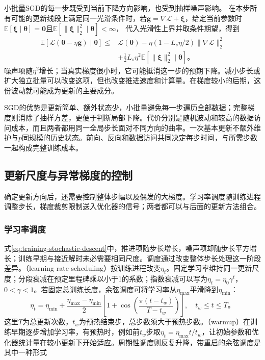 小批量SGD的每一步既受到当前下降方向影响，也受到抽样噪声影响。
在本步所有可能的更新线段上满足同一光滑条件时，若$\bm g=\nabla\mathcal L+\bm\xi$，给定当前参数时
$\mathbb E[\bm\xi\mid\bm\theta]=\bm0$且$\mathbb E[\lVert\bm\xi\rVert_2^2\mid\bm\theta]<\infty$，
代入光滑性上界并取条件期望，得到
\begin{equation}
  \begin{aligned}
  \mathbb E[\mathcal L(\bm\theta-\eta\bm g)\mid\bm\theta]
  \leq{}&\mathcal L(\bm\theta)
    -\eta(1-L_s\eta/2)\lVert\nabla\mathcal L\rVert_2^2\\
    &+\tfrac12L_s\eta^2\mathbb E[\lVert\bm\xi\rVert_2^2\mid\bm\theta]\text{。}
  \end{aligned}
  \label{eq:training-stochastic-descent}
\end{equation}
噪声项随$\eta^2$增长；当真实梯度很小时，它可能抵消这一步的预期下降。减小步长或扩大独立批量可以改变这项，但也改变推进速度和计算量。在梯度较小的后期，这份波动就可能成为更新的主要成分。

SGD的优势是更新简单、额外状态少，小批量避免每一步遍历全部数据；完整梯度则消除了抽样方差，更便于判断局部下降。代价分别是随机波动和较高的数据访问成本，而且两者都用同一全局步长面对不同方向的曲率。一次基本更新不额外维护与$p$同规模的历史状态。前向、反向和数据访问共同决定每步时间，与所需步数一起构成完整训练成本。

\subsection{更新尺度与异常梯度的控制}
\label{sec:training-step-control}

确定更新方向后，还需要控制整体步幅以及偶发的大梯度。学习率调度随训练进程调整步长，梯度裁剪限制送入优化器的信号；两者都可以与后面的更新方法组合。

\subsubsection{学习率调度}
\label{sec:training-schedules}

式\eqref{eq:training-stochastic-descent}中，推进项随步长增长，噪声项却随步长平方增长；训练早期与接近解时未必需要相同尺度。调度通过改变整体步长处理这一阶段差异。（learning rate scheduling）按训练进程改变$\eta_t$。固定学习率维持同一更新尺度；分段衰减在预定里程碑乘以小于1的系数；指数衰减可以写为$\eta_t=\eta_0\gamma^t$，$0<\gamma<1$。若固定总训练长度，余弦调度可将学习率从$\eta_{\max}$平滑降到$\eta_{\min}$：
\begin{equation}
  \eta_t=\eta_{\min}+\frac{\eta_{\max}-\eta_{\min}}2
  \left[1+\cos\left(\frac{\pi(t-t_w)}{T-t_w}\right)\right],
  \quad t_w\leq t\leq T\text{。}
  \label{eq:training-cosine-schedule}
\end{equation}
这里$T$为总更新次数，$t_w$为预热结束步，总步数须大于预热步数。（warmup）在训练早期逐步增加学习率，有预热时，例如前$t_w$步取$\eta_t=\eta_{\max}t/t_w$，让初始参数和优化器统计量在较小更新下开始适应。周期性调度则反复升降，带重启的余弦调度是其中一种形式

